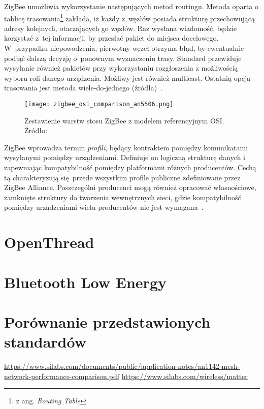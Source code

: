 ZigBee umożliwia wykorzystanie następujących metod routingu. Metoda oparta o tablicę trasowania\footnote{z ang. \textit{Routing Table}}
zakłada, iż każdy z~węzłów posiada strukturę przechowującą adresy kolejnych, otaczających go węzłów. Raz wysłana wiadomość,
będzie korzystać z~tej informacji, by przesłać pakiet do miejsca docelowego. W~przypadku niepowodzenia, pierwotny węzeł otrzyma
błąd, by ewentualnie podjąć dalszą decyzję o~ponownym wyznaczeniu trasy. Standard przewiduje wysyłanie również pakietów
przy wykorzystaniu rozgłoszenia z możliwością wyboru roli danego urządzenia. Możliwy jest również multicast. Ostatnią
opcją trasowania jest metoda wiele-do-jednego (źródła)~\cite{silicon_laboratories_ug10302_2021}.

\begin{figure}[!ht]
	\centering \texttt{[image: zigbee\_osi\_comparison\_an5506.png]}
	\caption{Zestawienie warstw stosu ZigBee z modelem referencyjnym OSI. Źródło:~\cite{stmicroelectronics_an5506_2020}}
	\label{rys:zigbee_osi_comparison_an5506}
\end{figure}

ZigBee wprowadza termin \textit{profili}, będący kontraktem pomiędzy komunikatami wysyłanymi pomiędzy urządzeniami. Definiuje on
logiczną strukturę danych i zapewniając kompatybilność pomiędzy platformami różnych producentów. Cechą tą charakteryzują
się przede wszystkim profile publiczne zdefiniowane przez ZigBee Alliance. Poszczególni producenci mogą 
również opracować własnościowe, zamknięte struktury do tworzenia wewnętrznych sieci, gdzie kompatybilność pomiędzy
urządzeniami wielu producentów nie jest wymagana~\cite{zigbee_alliance_zigbee_2017, stmicroelectronics_an5506_2020, zigbee_alliance_zigbee_2017}.

\section{OpenThread}
\lipsum[1-10]

\section{Bluetooth Low Energy}
\lipsum[1-10]

\section{Porównanie przedstawionych standardów} %
\url{https://www.silabs.com/documents/public/application-notes/an1142-mesh-network-performance-comparison.pdf}
\url{https://www.silabs.com/wireless/matter}
\lipsum[1-15]


